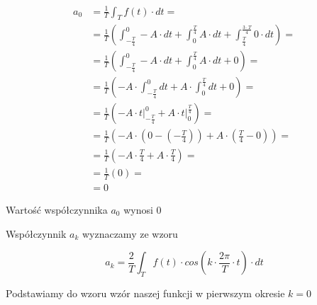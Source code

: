 \begin{equation}
\begin{aligned}
a_0 &=\frac{1}{T}\int_{T}f(t) \cdot dt =\\
&=\frac{1}{T} \left( \int_{-\frac{T}{4}}^{0} -A \cdot dt + 
\int_{0}^{\frac{T}{4}} A \cdot dt +
\int_{\frac{T}{4}}^{\frac{3\cdot T}{4}} 0 \cdot dt \right ) = \\
&=\frac{1}{T} \left( \int_{-\frac{T}{4}}^{0} -A \cdot dt + 
\int_{0}^{\frac{T}{4}} A \cdot dt + 0 \right ) = \\
&=\frac{1}{T} \left( -A \cdot \int_{-\frac{T}{4}}^{0} dt + 
A \cdot \int_{0}^{\frac{T}{4}} dt + 0 \right ) = \\
&=\frac{1}{T} \left( -A \cdot \left. t \right|_{-\frac{T}{4}}^{0} + 
A \cdot \left. t \right|_{0}^{\frac{T}{4}}\right ) = \\
&=\frac{1}{T} \left( -A \cdot \left( 0 - \left(-\frac{T}{4}\right) \right) + 
A \cdot \left( \frac{T}{4} - 0 \right)\right ) = \\
&=\frac{1}{T} \left( -A \cdot \frac{T}{4} + 
A \cdot \frac{T}{4}\right ) = \\
&=\frac{1}{T} \left( 0 \right ) = \\
&=0
\end{aligned}
\end{equation}

Wartość współczynnika $a_0$ wynosi $0$


Współczynnik $a_k$ wyznaczamy ze wzoru

\begin{equation}
a_k=\frac{2}{T}\int_{T}f(t) \cdot cos\left( k \cdot \frac{2\pi}{T} \cdot t\right) \cdot dt
\end{equation}

Podstawiamy do wzoru wzór naszej funkcji w pierwszym okresie $k=0$

